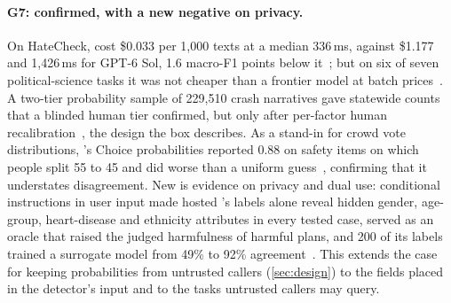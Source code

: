 \paragraph{G7: confirmed, with a new negative on privacy.}
On HateCheck, \jev{} cost \$0.033 per 1{,}000 texts at a median 336\,ms, against \$1.177 and 1{,}426\,ms for GPT-6 Sol, 1.6 macro-F1 points below it~\cite{arx03324}; but on six of seven political-science tasks it was not cheaper than a frontier model at batch prices~\cite{arx06625}.
A two-tier probability sample of 229{,}510 crash narratives gave statewide counts that a blinded human tier confirmed, but only after per-factor human recalibration~\cite{arx10321}, the design the box describes.
As a stand-in for crowd vote distributions, \jev{}'s Choice probabilities reported 0.88 on safety items on which people split 55 to 45 and did worse than a uniform guess~\cite{zen23179064}\zmark{}, confirming that it understates disagreement.
New is evidence on privacy and dual use: conditional instructions in user input made hosted \jev{}'s labels alone reveal hidden gender, age-group, heart-disease and ethnicity attributes in every tested case, \jev{} served as an oracle that raised the judged harmfulness of harmful plans, and 200 of its labels trained a surrogate model from 49\% to 92\% agreement~\cite{arx04985}.
This extends the case for keeping probabilities from untrusted callers (\cref{sec:design}) to the fields placed in the detector's input and to the tasks untrusted callers may query.
